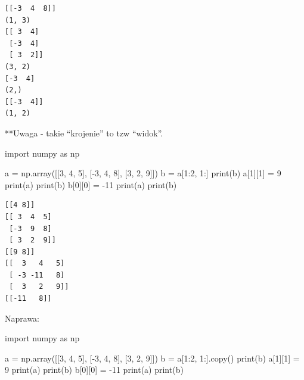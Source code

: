 \documentclass[
  letterpaper,
  DIV=11,
  numbers=noendperiod]{scrreprt}
\newenvironment{Shaded}{\begin{snugshade}}{\end{snugshade}}
\newcommand{\BuiltInTok}[1]{\textcolor[rgb]{0.00,0.23,0.31}{#1}}
\newcommand{\DecValTok}[1]{\textcolor[rgb]{0.68,0.00,0.00}{#1}}
\newcommand{\ImportTok}[1]{\textcolor[rgb]{0.00,0.46,0.62}{#1}}
\newcommand{\NormalTok}[1]{\textcolor[rgb]{0.00,0.23,0.31}{#1}}
\newcommand{\OperatorTok}[1]{\textcolor[rgb]{0.37,0.37,0.37}{#1}}
\begin{document}
\begin{verbatim}
[[-3  4  8]]
(1, 3)
[[ 3  4]
 [-3  4]
 [ 3  2]]
(3, 2)
[-3  4]
(2,)
[[-3  4]]
(1, 2)
\end{verbatim}

**Uwaga - takie ``krojenie'' to tzw ``widok''.

\begin{Shaded}
\begin{Highlighting}[]
\ImportTok{import}\NormalTok{ numpy }\ImportTok{as}\NormalTok{ np}

\NormalTok{a }\OperatorTok{=}\NormalTok{ np.array([[}\DecValTok{3}\NormalTok{, }\DecValTok{4}\NormalTok{, }\DecValTok{5}\NormalTok{], [}\OperatorTok{{-}}\DecValTok{3}\NormalTok{, }\DecValTok{4}\NormalTok{, }\DecValTok{8}\NormalTok{], [}\DecValTok{3}\NormalTok{, }\DecValTok{2}\NormalTok{, }\DecValTok{9}\NormalTok{]])}
\NormalTok{b }\OperatorTok{=}\NormalTok{ a[}\DecValTok{1}\NormalTok{:}\DecValTok{2}\NormalTok{, }\DecValTok{1}\NormalTok{:]}
\BuiltInTok{print}\NormalTok{(b)}
\NormalTok{a[}\DecValTok{1}\NormalTok{][}\DecValTok{1}\NormalTok{] }\OperatorTok{=} \DecValTok{9}
\BuiltInTok{print}\NormalTok{(a)}
\BuiltInTok{print}\NormalTok{(b)}
\NormalTok{b[}\DecValTok{0}\NormalTok{][}\DecValTok{0}\NormalTok{] }\OperatorTok{=} \OperatorTok{{-}}\DecValTok{11}
\BuiltInTok{print}\NormalTok{(a)}
\BuiltInTok{print}\NormalTok{(b)}
\end{Highlighting}
\end{Shaded}

\begin{verbatim}
[[4 8]]
[[ 3  4  5]
 [-3  9  8]
 [ 3  2  9]]
[[9 8]]
[[  3   4   5]
 [ -3 -11   8]
 [  3   2   9]]
[[-11   8]]
\end{verbatim}

Naprawa:

\begin{Shaded}
\begin{Highlighting}[]
\ImportTok{import}\NormalTok{ numpy }\ImportTok{as}\NormalTok{ np}

\NormalTok{a }\OperatorTok{=}\NormalTok{ np.array([[}\DecValTok{3}\NormalTok{, }\DecValTok{4}\NormalTok{, }\DecValTok{5}\NormalTok{], [}\OperatorTok{{-}}\DecValTok{3}\NormalTok{, }\DecValTok{4}\NormalTok{, }\DecValTok{8}\NormalTok{], [}\DecValTok{3}\NormalTok{, }\DecValTok{2}\NormalTok{, }\DecValTok{9}\NormalTok{]])}
\NormalTok{b }\OperatorTok{=}\NormalTok{ a[}\DecValTok{1}\NormalTok{:}\DecValTok{2}\NormalTok{, }\DecValTok{1}\NormalTok{:].copy()}
\BuiltInTok{print}\NormalTok{(b)}
\NormalTok{a[}\DecValTok{1}\NormalTok{][}\DecValTok{1}\NormalTok{] }\OperatorTok{=} \DecValTok{9}
\BuiltInTok{print}\NormalTok{(a)}
\BuiltInTok{print}\NormalTok{(b)}
\NormalTok{b[}\DecValTok{0}\NormalTok{][}\DecValTok{0}\NormalTok{] }\OperatorTok{=} \OperatorTok{{-}}\DecValTok{11}
\BuiltInTok{print}\NormalTok{(a)}
\BuiltInTok{print}\NormalTok{(b)}
\end{Highlighting}
\end{Shaded}
\end{document}
